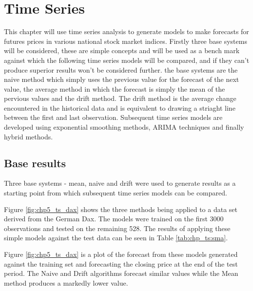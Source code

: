 
\chapter{Time Series} %

\label{Chapter5} %



This chapter will use time series analysis to generate models to make forecasts for futures prices in various national stock market indices. Firstly three base systems will be considered, these are simple concepts and will be used as a bench mark against which the following time series models will be compared, and if they can't produce superior results won't be considered further. the base systems are the naive method which simply uses the previous value for the forecast of the next value, the average method in which the forecast is simply the mean of the pervious values and the drift method. The drift method is the average change encountered in the historical data and is equivalent to drawing a striaght line between the first and last observation. Subsequent time series models are developed using exponential smoothing methods, ARIMA techniques and finally hybrid methods.

\section{Base results}
Three base systems - mean, naive and drift were used to generate results as a starting point from which subsequent time series models can be compared. 

Figure \ref{fig:chp5_ts_dax} shows the three methods being applied to a data set derived from the German Dax. The models were trained on the first 3000 observations and tested on the remaining 528. The results of applying these simple models against the test data can be seen in Table \ref{tab:chp_ts:sma}.



Figure \ref{fig:chp5_ts_dax} is a plot of the forecast from these models generated against the training set and forecasting the closing price at the end of the test period. The Naive and Drift algorithms forecast similar values while the Mean method produces a markedly lower value.

